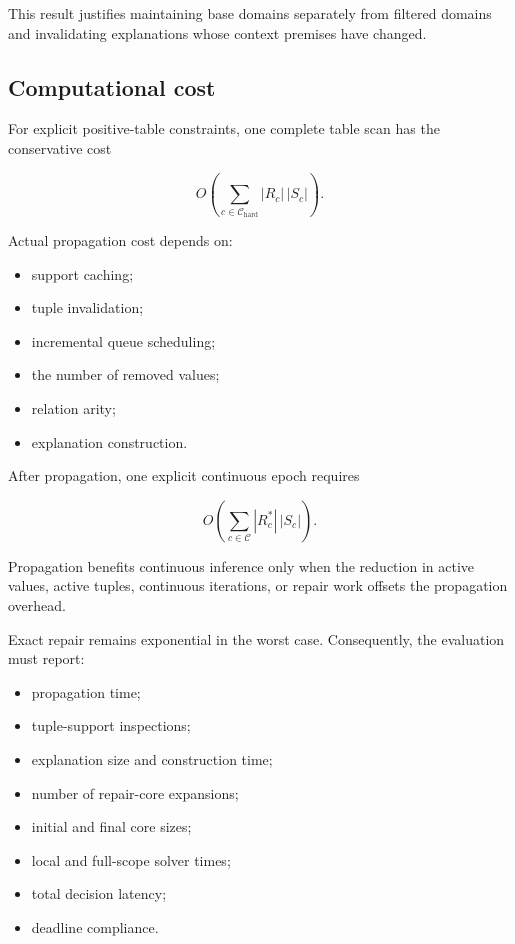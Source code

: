 \documentclass[pdflatex,sn-mathphys-num,iicol,oneside]{sn-jnl}
\begin{document}
This result justifies maintaining base domains separately from
filtered domains and invalidating explanations whose context premises
have changed.

\subsection{Computational cost}

For explicit positive-table constraints, one complete table scan has
the conservative cost

\begin{equation}
O\left(
\sum_{c\in\mathcal{C}_{\mathrm{hard}}}
|R_c|\,|S_c|
\right).
\label{eq:gac-cost}
\end{equation}

Actual propagation cost depends on:

\begin{itemize}
    \item support caching;
    \item tuple invalidation;
    \item incremental queue scheduling;
    \item the number of removed values;
    \item relation arity;
    \item explanation construction.
\end{itemize}

After propagation, one explicit continuous epoch requires

\begin{equation}
O\left(
\sum_{c\in\mathcal{C}}
|R_c^{*}|\,|S_c|
\right).
\label{eq:continuous-cost}
\end{equation}

Propagation benefits continuous inference only when the reduction in
active values, active tuples, continuous iterations, or repair work
offsets the propagation overhead.

Exact repair remains exponential in the worst case. Consequently, the
evaluation must report:

\begin{itemize}
    \item propagation time;
    \item tuple-support inspections;
    \item explanation size and construction time;
    \item number of repair-core expansions;
    \item initial and final core sizes;
    \item local and full-scope solver times;
    \item total decision latency;
    \item deadline compliance.
\end{itemize}
\end{document}
